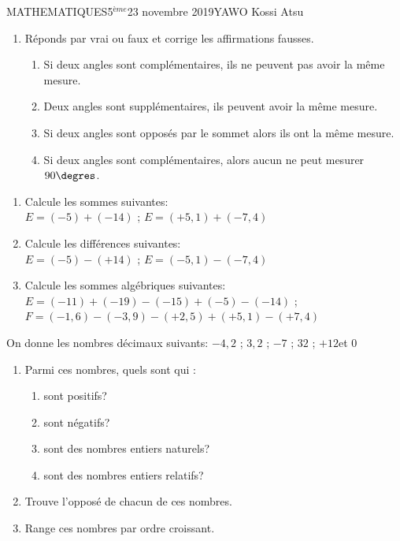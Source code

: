 \documentclass[12pt,a4paper]{book}
\newcommand{\prof}{YAWO Kossi Atsu}
\newcommand{\matiere}{MATHEMATIQUES}
\newcommand{\classe}{5$^{ème}$}
\begin{document}
\begin{td}{\matiere}{\classe}{23 novembre 2019}{\prof}
\begin{exo}
\begin{enumerate}
\item Réponds par vrai ou faux et corrige les affirmations fausses.
\begin{enumerate}
\item Si deux angles sont complémentaires, ils ne peuvent pas avoir la même mesure.
\item Deux angles sont supplémentaires, ils peuvent avoir la même mesure.
\item Si deux angles sont opposés par le sommet alors ils ont la même mesure.
\item Si deux angles sont complémentaires, alors aucun ne peut mesurer $90\degres$.
\end{enumerate}
\end{enumerate} 
\end{exo}

\vspace{0.5cm}

\begin{exo}
\begin{enumerate}
\item Calcule les sommes suivantes:\\
$E=(-5)+(-14)$ \qquad ; \qquad
$E=(+5,1)+(-7,4)$
\item Calcule les différences suivantes:\\
$E=(-5)-(+14)$ \qquad ; \qquad
$E=(-5,1)-(-7,4)$
\item Calcule les sommes algébriques suivantes:\\
$E=(-11)+(-19)-(-15)+(-5)-(-14)$ \qquad ; \qquad
$F=(-1,6)-(-3,9)-(+2,5)+(+5,1)-(+7,4)$
\end{enumerate}
\end{exo}

\vspace{0.5cm}
\begin{exo}
On donne les nombres décimaux suivants: $-4,2$ \qquad ; \qquad $3,2$ \qquad ; \qquad $-7$ \qquad ; \qquad $32$ \qquad ; \qquad $+12$\qquad et \qquad $0$
\begin{enumerate}
\item Parmi ces nombres, quels sont qui : 
\begin{enumerate}
\item sont positifs?
\item sont négatifs?
\item sont des nombres entiers naturels?
\item sont des nombres entiers relatifs?
\end{enumerate} 
\item Trouve l'opposé de chacun de ces nombres.
\item Range ces nombres par ordre croissant.
\end{enumerate}
\end{exo}
\end{td}
\end{document}
